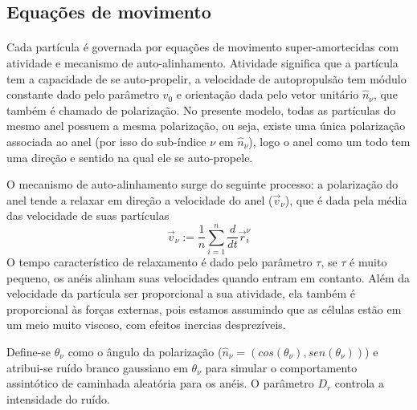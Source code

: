 \documentclass{article}
\theoremstyle{definition}
\def \quantity#1#2#3{\vec{#1}_{#2}^{#3}}
\def \pos#1#2{\quantity{r}{#1}{#2}}
\begin{document}
\subsection{Equações de movimento}
\paragraph{}
Cada partícula é governada por equações de movimento super-amortecidas com atividade e mecanismo de auto-alinhamento. Atividade significa que a partícula tem a capacidade de se auto-propelir, a velocidade de autopropulsão tem módulo constante dado pelo parâmetro $v_0$ e orientação dada pelo vetor unitário $\hat n_\nu$, que também é chamado de polarização. No presente modelo, todas as partículas do mesmo anel possuem a mesma polarização, ou seja, existe uma única polarização associada ao anel (por isso do sub-índice $\nu$ em $\hat n_\nu$), logo o anel como um todo tem uma direção e sentido na qual ele se auto-propele. 

O mecanismo de auto-alinhamento surge do seguinte processo: a polarização do anel tende a relaxar em direção a velocidade do anel ($\vec v_\nu$), que é dada pela média das velocidade de suas partículas 
\begin{equation}
\vec v_{\nu} := \frac{1}{n} \sum_{i=1}^n \frac{d}{dt}\pos{i}{\nu}
\label{eq:vel_cm}
\end{equation}
O tempo característico de relaxamento é dado pelo parâmetro $\tau$, se $\tau$ é muito pequeno, os anéis alinham suas velocidades quando entram em contanto.
Além da velocidade da partícula ser proporcional a sua atividade, ela também é proporcional às forças externas, pois estamos assumindo que as células estão em um meio muito viscoso, com efeitos inercias desprezíveis.

Define-se $\theta_\nu$ como o ângulo da polarização ($\hat n_\nu = (cos(\theta_\nu), sen(\theta_\nu))$) e atribui-se  ruído branco gaussiano em $\theta_\nu$ para simular o comportamento assintótico de caminhada aleatória para os anéis. O parâmetro $D_r$ controla a intensidade do ruído.
\end{document}
